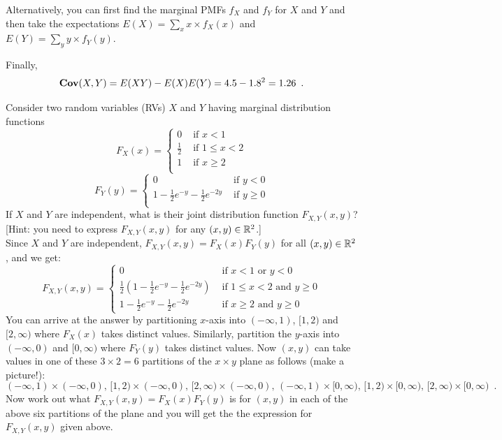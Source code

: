 \begin{ExerciseList}
Alternatively, you can first find the marginal PMFs $f_X$ and $f_Y$ for $X$ and $Y$ and then take the expectations $E(X)=\sum_x x \times f_X(x)$ and $E(Y)=\sum_y y \times f_Y(y)$.

Finally, 
\[
\mathbf{Cov}(X,Y) = E(XY)-E(X)E(Y) = 4.5 - 1.8^2 = 1.26 \enspace .
\]

\Exercise
Consider two random variables (RVs) $X$ and $Y$ having marginal distribution functions
\[
F_X(x) =
\begin{cases}
0 & \text{ if } x < 1\\
\frac{1}{2} & \text{ if } 1 \leq x < 2\\
1 & \text{ if } x \geq 2\\
\end{cases}
\] 
\[
F_Y(y) =
\begin{cases}
0 & \text{ if } y < 0\\
1-\frac{1}{2}e^{-y}-\frac{1}{2}e^{-2y} & \text{ if } y \geq 0\\
\end{cases}
\]
If $X$ and $Y$ are independent, what is their joint distribution function $F_{X,Y}(x,y)$? [Hint: you need to express $F_{X,Y}(x,y)$ for any $(x,y) \in \mathbb{R}^2$.]
\Answer
~\\
Since $X$ and $Y$ are independent, $F_{X,Y}(x,y) = F_X(x) F_Y(y)$ for all $(x,y) \in \mathbb{R}^2$, and we get:
\[
F_{X,Y}(x,y) = 
\begin{cases}
0 & \text{ if } x < 1 \text{ or } y < 0\\
\frac{1}{2}\left(1-\frac{1}{2}e^{-y}-\frac{1}{2}e^{-2y}\right) & \text{ if } 1 \leq x < 2 \text{ and } y \geq 0\\
1-\frac{1}{2}e^{-y}-\frac{1}{2}e^{-2y} & \text{ if } x \geq 2 \text{ and } y \geq 0
\end{cases}
\]
{\small
You can arrive at the answer by partitioning $x$-axis into $(-\infty,1)$, $[1,2)$ and $[2,\infty)$ where $F_X(x)$ takes distinct values.  Similarly, partition the $y$-axis into  $(-\infty,0)$ and $[0,\infty)$ where $F_Y(y)$ takes distinct values.  
Now $(x,y)$ can take values in one of these $3 \times 2=6$ partitions of the $x \times y$ plane as follows (make a picture!):
\[
(-\infty,1) \times (-\infty,0), \,
[1,2) \times (-\infty,0), \,
[2,\infty) \times (-\infty,0), \,
(-\infty,1) \times [0,\infty), \,
[1,2) \times [0,\infty), \,
[2,\infty) \times [0,\infty) \enspace .
\]
Now work out what $F_{X,Y}(x,y) = F_X(x) F_Y(y)$ is for $(x,y)$ in each of the above six partitions of the plane and you will get the the expression for $F_{X,Y}(x,y)$ given above.
}


\end{ExerciseList}
